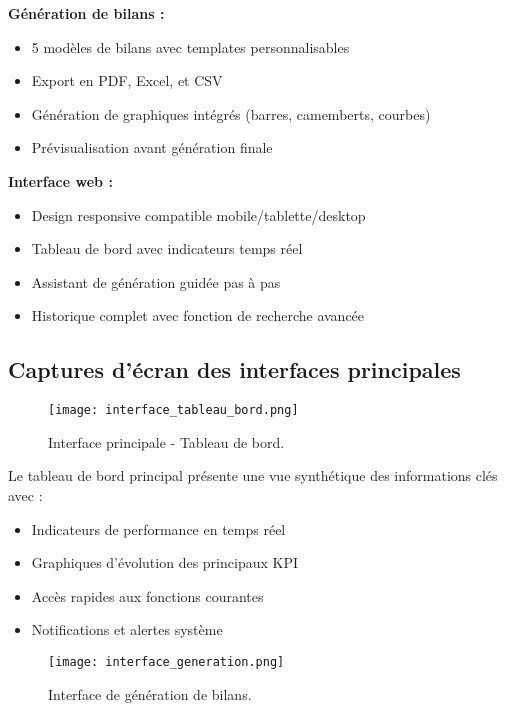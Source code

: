 \textbf{Génération de bilans :}
\begin{itemize}
    \item 5 modèles de bilans avec templates personnalisables
    \item Export en PDF, Excel, et CSV
    \item Génération de graphiques intégrés (barres, camemberts, courbes)
    \item Prévisualisation avant génération finale
\end{itemize}

\textbf{Interface web :}
\begin{itemize}
    \item Design responsive compatible mobile/tablette/desktop
    \item Tableau de bord avec indicateurs temps réel
    \item Assistant de génération guidée pas à pas
    \item Historique complet avec fonction de recherche avancée
\end{itemize}

\subsection{Captures d'écran des interfaces principales}

\begin{figure}[hbt!]
    \centering
    \texttt{[image: interface\_tableau\_bord.png]}
    \caption{Interface principale - Tableau de bord.}
    \label{fig:interface-dashboard}
\end{figure}

Le tableau de bord principal présente une vue synthétique des informations clés avec :
\begin{itemize}
    \item Indicateurs de performance en temps réel
    \item Graphiques d'évolution des principaux KPI
    \item Accès rapides aux fonctions courantes
    \item Notifications et alertes système
\end{itemize}

\begin{figure}[hbt!]
    \centering
    \texttt{[image: interface\_generation.png]}
    \caption{Interface de génération de bilans.}
    \label{fig:interface-generation}
\end{figure}

